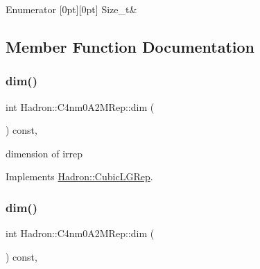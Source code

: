 \begin{DoxyEnumFields}{Enumerator}
[0pt][0pt]{}\mbox{\label{structHadron_1_1C4nm0A2MRep_af05e3d79dad1e9a90bdcf57b65fea4d6a3998fd84a95851a3b26168ee6502f337}} 
Size\+\_\+t&\\
\hline

\end{DoxyEnumFields}


\subsection{Member Function Documentation}
\mbox{\label{structHadron_1_1C4nm0A2MRep_a74531346885cc1d3a3b3e7749bfbc5f7}} 
\subsubsection{\texorpdfstring{dim()}{dim()}\hspace{0.1cm}{\footnotesize\ttfamily [1/3]}}
{\footnotesize\ttfamily int Hadron\+::\+C4nm0\+A2\+M\+Rep\+::dim (\begin{DoxyParamCaption}{ }\end{DoxyParamCaption}) const\hspace{0.3cm}{\ttfamily [inline]}, {\ttfamily [virtual]}}

dimension of irrep 

Implements \mbox{\hyperlink{structHadron_1_1CubicLGRep_a3acbaea26503ed64f20df693a48e4cdd}{Hadron\+::\+Cubic\+L\+G\+Rep}}.

\mbox{\label{structHadron_1_1C4nm0A2MRep_a74531346885cc1d3a3b3e7749bfbc5f7}} 
\subsubsection{\texorpdfstring{dim()}{dim()}\hspace{0.1cm}{\footnotesize\ttfamily [2/3]}}
{\footnotesize\ttfamily int Hadron\+::\+C4nm0\+A2\+M\+Rep\+::dim (\begin{DoxyParamCaption}{ }\end{DoxyParamCaption}) const\hspace{0.3cm}{\ttfamily [inline]}, {\ttfamily [virtual]}}

